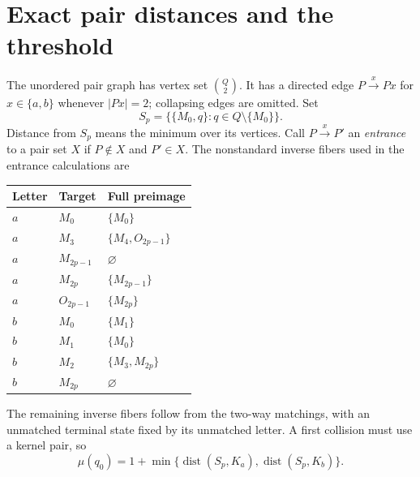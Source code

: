 \documentclass[11pt]{article}
\newcommand{\dist}{\operatorname{dist}}
\newcommand{\M}[1]{M_{#1}}
\newcommand{\Ost}[1]{O_{#1}}
\newcommand{\pair}[2]{\{#1,#2\}}
\begin{document}
\section{Exact pair distances and the threshold}
The unordered pair graph has vertex set $\binom Q2$. It has a directed edge $P\xrightarrow{x}Px$ for $x\in\{a,b\}$ whenever $|Px|=2$; collapsing edges are omitted. Set
\[
 S_p=\{\pair{\M0}{q}:q\in Q\setminus\{\M0\}\}.
\]
Distance from $S_p$ means the minimum over its vertices. Call $P\xrightarrow{x}P'$ an \emph{entrance} to a pair set $X$ if $P\notin X$ and $P'\in X$. The nonstandard inverse fibers used in the entrance calculations are
\begin{center}\small
\begin{tabular}{@{}lll@{}}\toprule
Letter & Target & Full preimage\\\midrule
$a$ & $\M0$ & $\{\M0\}$\\
$a$ & $\M3$ & $\{\M4,\Ost{2p-1}\}$\\
$a$ & $\M{2p-1}$ & $\varnothing$\\
$a$ & $\M{2p}$ & $\{\M{2p-1}\}$\\
$a$ & $\Ost{2p-1}$ & $\{\M{2p}\}$\\
$b$ & $\M0$ & $\{\M1\}$\\
$b$ & $\M1$ & $\{\M0\}$\\
$b$ & $\M2$ & $\{\M3,\M{2p}\}$\\
$b$ & $\M{2p}$ & $\varnothing$\\\bottomrule
\end{tabular}
\end{center}
The remaining inverse fibers follow from the two-way matchings, with an unmatched terminal state fixed by its unmatched letter. A first collision must use a kernel pair, so
\begin{equation}\label{eq:reduction}
 \mu(q_0)=1+\min\{\dist(S_p,K_a),\dist(S_p,K_b)\}.
\end{equation}
\end{document}
